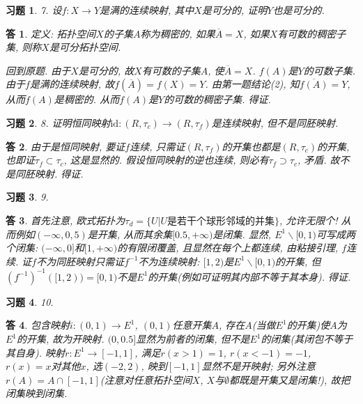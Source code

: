 \documentclass{ctexart}%
\newtheorem*{exercise}{习题}
\newtheorem*{solution}{答}
\theoremstyle{definition}
\theoremstyle{remark}
\begin{document}
\begin{exercise}7. 设$f: X\rightarrow Y$是满的连续映射, 其中$X$是可分的, 证明$Y$也是可分的. 
\end{exercise}
\begin{solution}定义: 拓扑空间$X$的子集$A$称为稠密的, 如果$\overline{A}=X$, 如果$X$有可数的稠密子集, 则称$X$是可分拓扑空间. 

回到原题. 由于$X$是可分的, 故$X$有可数的子集$A$, 使$\overline{A}=X$. $f(A)$是$Y$的可数子集. 由于$f$是满的连续映射,  故$f(\overline{A})=f(X)=Y$. 由第一题结论(2), 知$\overline{f(A)}=Y$, 从而$f(A)$是稠密的. 从而$f(A)$是$Y$的可数的稠密子集. 得证.
\end{solution}

\begin{exercise}8. 证明恒同映射$\text{id}: (R,\tau_c)\rightarrow(R,\tau_f)$是连续映射, 但不是同胚映射. 
\end{exercise}
\begin{solution}由于是恒同映射, 要证$f$连续, 只需证$(R,\tau_f)$的开集也都是$(R,\tau_c)$的开集, 也即证$\tau_f\subset \tau_c$, 这是显然的. 假设恒同映射的逆也连续, 则必有$\tau_f \supset \tau_c$, 矛盾. 故不是同胚映射. 得证. 
\end{solution}

\begin{exercise}9.
\end{exercise}
\begin{solution}首先注意, 欧式拓扑为$\tau_d=\{U|U\text{是若干个球形邻域的并集}\}$, 允许无限个! 从而例如$(-\infty,0,5)$是开集, 从而其余集$[0.5,+\infty)$是闭集. 显然, $E^1\backslash [0,1)$可写成两个闭集: $(-\infty,0]$和$[1,+\infty)$的有限闭覆盖, 且显然在每个上都连续, 由粘接引理, $f$连续. 证$f$不为同胚映射只需证$f^{-1}$不为连续映射: $[1,2)$是$E^1\backslash[0,1)$的开集, 但$(f^{-1})^{-1}([1,2))=[0,1)$不是$E^1$的开集(例如可证明其内部不等于其本身). 得证.  
\end{solution}

\begin{exercise}10.
\end{exercise}
\begin{solution}包含映射$i: (0,1)\rightarrow E^1$, $(0,1)$任意开集$A$, 存在$A$(当做$E^1$的开集)使$A$为$E^1$的开集, 故为开映射. $(0,0.5]$显然为前者的闭集, 但不是$E^1$的闭集(其闭包不等于其自身). 映射$r:E^1\rightarrow [-1,1]$, 满足$r(x>1)=1$, $r(x<-1)=-1$, $r(x)=x$对其他$x$, 选$(-2,2)$, 映到$[-1,1]$显然不是开映射; 另外注意$r(A)=A\cap [-1,1]$(注意对任意拓扑空间$X$, $X$与$\emptyset$都既是开集又是闭集!), 故把闭集映到闭集.  
\end{solution}
\end{document}
